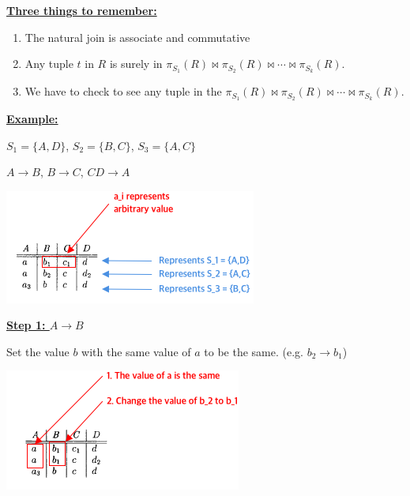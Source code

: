 \documentclass[12pt]{article}
\begin{document}
\begin{enumerate}[1.]
\begin{enumerate}[a)]
\begin{itemize}
            \bigskip

            \underline{\textbf{Three things to remember:}}

            \begin{enumerate}[1.]
                \item The natural join is associate and commutative
                \item Any tuple $t$ in $R$ is surely in $\pi_{S_1}(R) \bowtie \pi_{S_2}(R) \bowtie \cdots \bowtie \pi_{S_k}(R)$.
                \item We have to check to see any tuple in the $\pi_{S_1}(R) \bowtie \pi_{S_2}(R) \bowtie \cdots \bowtie \pi_{S_k}(R)$.
            \end{enumerate}

            \bigskip

            \underline{\textbf{Example:}}

            \bigskip

            $S_1 = \{A,D\}$, $S_2 = \{B,C\}$, $S_3 = \{A,C\}$

            \bigskip

            $A \to B$, $B \to C$, $CD \to A$

            \begin{center}
            \includegraphics[width=0.7\linewidth]{images/worksheet_13_solution_1.png}
            \end{center}

            \bigskip

            \underline{\textbf{Step 1: $A \to B$}}

            \bigskip

            Set the value $b$ with the same value of $a$ to be the same. (e.g. $b_2 \to b_1$)

            \bigskip

            \begin{center}
            \includegraphics[width=0.7\linewidth]{images/worksheet_13_solution_2.png}
            \end{center}



\end{itemize}
\end{enumerate}
\end{enumerate}
\end{document}
